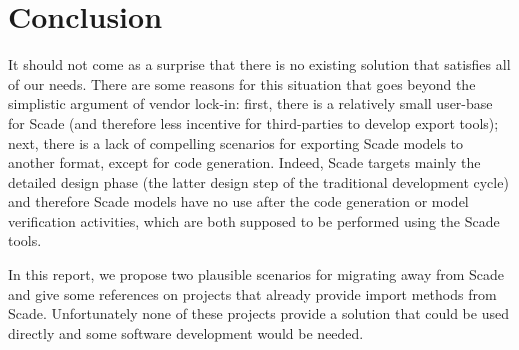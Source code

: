 \documentclass{template/openetcs_report}
\begin{document}
\chapter{Conclusion}


It should not come as a surprise that there is no existing solution
that satisfies all of our needs. There are some reasons for this
situation that goes beyond the simplistic argument of vendor lock-in:
first, there is a relatively small user-base for Scade (and therefore
less incentive for third-parties to develop export tools); next, there
is a lack of compelling scenarios for exporting Scade models to
another format, except for code generation. Indeed, Scade targets
mainly the detailed design phase (the latter design step of the
traditional development cycle) and therefore Scade models have no use
after the code generation or model verification activities, which are
both supposed to be performed using the Scade tools.

In this report, we propose two plausible scenarios for migrating away
from Scade and give some references on projects that already provide
import methods from Scade. Unfortunately none of these projects
provide a solution that could be used directly and some software
development would be needed.









\end{document}
